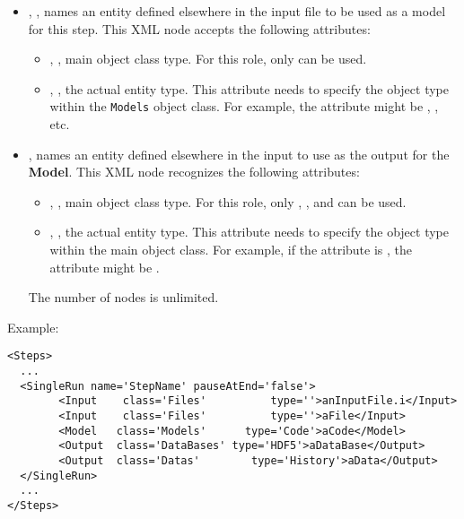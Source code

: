 \begin{itemize}
\item {}, , names an entity
defined elsewhere in the input file to be used as a model for this step.
This XML node accepts the following attributes:
\begin{itemize}
  \item {}, , main object class
    type.
    For this role, only  can be used.
  \item {}, , the actual entity
    type.
    This attribute needs to specify the object type within the \texttt{Models}
    object class.
    For example, the  attribute might be , 
    , etc.
\end{itemize}
\item {},  names an entity
defined elsewhere in the input to use as the output for the \textbf{Model}.
This XML node recognizes the following attributes:
\begin{itemize}
  \item {}, , main object class
    type.
    For this role, only , , and 
     can be used.
  \item {}, , the actual entity
    type.
    This attribute needs to specify the object type within the main object
    class.
    For example, if the   attribute is , the 
     attribute might be .
\end{itemize}
\nb The number of  nodes is unlimited.
\end{itemize}

Example:
\begin{lstlisting}[style=XML,morekeywords={class,pauseAtEnd}]
<Steps>
  ...
  <SingleRun name='StepName' pauseAtEnd='false'> 
        <Input    class='Files'          type=''>anInputFile.i</Input>
        <Input    class='Files'          type=''>aFile</Input>
        <Model   class='Models'      type='Code'>aCode</Model>
        <Output  class='DataBases' type='HDF5'>aDataBase</Output>
        <Output  class='Datas'        type='History'>aData</Output>
  </SingleRun>
  ...
</Steps>
\end{lstlisting}
